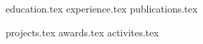 \documentclass[letterpaper,11pt]{article}
\begin{document}
\header{\nameFull}{
    \emailLink{\email} \\
    \websiteLink{\website} \\ 
    \githubLink{\github} \\
    \linkedinLink{\linkedin}
}

\resumeDescription

{education.tex}
{experience.tex}
{publications.tex}

{projects.tex}
{awards.tex}
{activites.tex}


\end{document}
